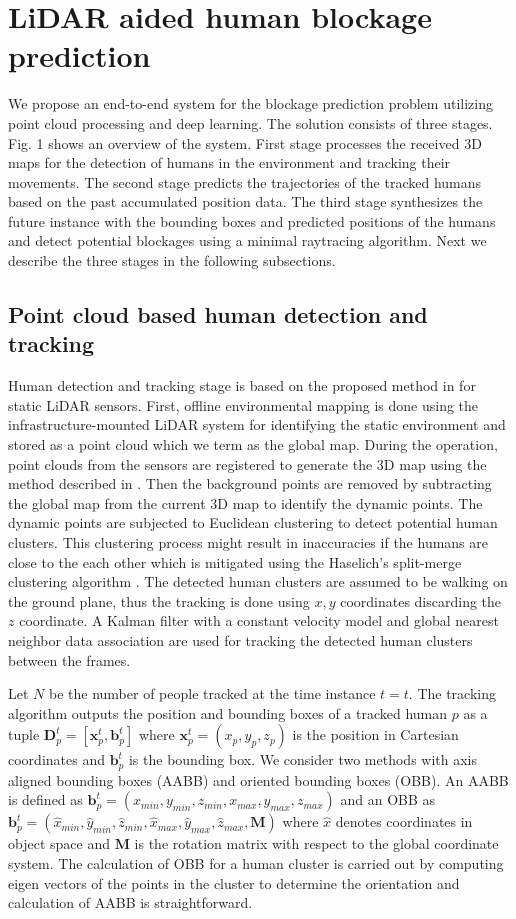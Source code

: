 \documentclass[conference]{IEEEtran}
\begin{document}
\section{LiDAR aided human blockage prediction}

We propose an end-to-end system for the blockage prediction problem utilizing point cloud processing and deep learning. The solution consists of three stages. Fig. 1 shows an overview of the system. First stage processes the received 3D maps for the detection of humans in the environment and tracking their movements. The second stage predicts the trajectories of the tracked humans based on the past accumulated position data. The third stage synthesizes the future instance with the bounding boxes and predicted positions of the humans and detect potential blockages using a minimal raytracing algorithm.  Next we describe the three stages in the following subsections.

\subsection{Point cloud based human detection and tracking}
Human detection and tracking stage is based on the proposed method in \cite{koide} for static LiDAR sensors. First, offline environmental mapping is done using the infrastructure-mounted LiDAR system for identifying the static environment and stored as a point cloud which we term as the global map. During the operation, point clouds from the sensors are registered to generate the 3D map using the method described in \cite{padmal2021elevated}. Then the background points are removed by subtracting the global map from the current 3D map to identify the dynamic points. The dynamic points are subjected to Euclidean clustering to detect potential human clusters. This clustering process might result in inaccuracies if the humans are close to the each other which is mitigated using the Haselich’s split-merge clustering algorithm \cite{Haselich}. The detected human clusters are assumed to be walking on the ground plane, thus the tracking is done using $x,y$ coordinates discarding the $z$ coordinate. A Kalman filter with a constant velocity model  and global nearest neighbor data association are used for tracking the detected human clusters between the frames.

Let $N$ be the number of people tracked at the time instance $t=t$. The tracking algorithm outputs the  position and bounding boxes of a tracked human $p$ as a tuple $\bm{D}^t_p=[ \bm{x}^t_p, \bm{b}^t_p] $ where $\bm{x}^t_p = (x_p,y_p,z_p)$ is the position in Cartesian coordinates and $\bm{b}^t_p$ is the bounding box. We consider two methods with axis aligned bounding boxes (AABB) and oriented bounding boxes (OBB). An AABB is defined as $\bm{b}^t_p = ( x_{min},y_{min}, z_{min}, x_{max},y_{max},z_{max})$ and an OBB as $\bm{b}^t_p = ( \hat{x}_{min},\hat{y}_{min},\hat{z}_{min}, \hat{x}_{max},\hat{y}_{max},\hat{z}_{max}, \bm{M})$ where $\hat{x}$ denotes coordinates in object space and $\bm{M}$ is the rotation matrix with respect to the global coordinate system. The calculation of OBB for a human cluster is carried out by computing eigen vectors of the points in the cluster to determine the orientation and calculation of AABB is straightforward. 
\end{document}
